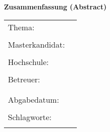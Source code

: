 
\begin{center}
{\Large \textbf{Zusammenfassung (Abstract)}}
\end{center}

\bigskip

\begin{center}
	\begin{tabular}{p{2.8cm}p{10cm}}
		Thema: & \thema \\
		 & \\
		Masterkandidat: & \autor \\
		 & \\
		Hochschule: & \firma \\
		 & \\
		Betreuer: & \prueferA  \\[.5ex]
		 &  \prueferB \\
		 & \\
		Abgabedatum: & \abgabedatum \\
		 & \\
		Schlagworte: & \schlagworte \\
		 & \\
	\end{tabular}
\end{center}

\bigskip

\noindent
\zusammenfassung
